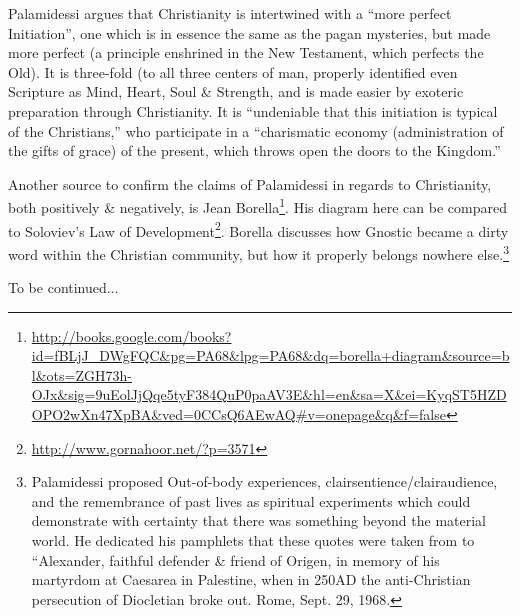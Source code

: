 Palamidessi argues that Christianity is intertwined with a ``more perfect Initiation'', one which is in essence the same as the pagan mysteries, but made more perfect (a principle enshrined in the New Testament, which perfects the Old). It is three-fold (to all three centers of man, properly identified even Scripture as Mind, Heart, Soul \& Strength, and is made easier by exoteric preparation through Christianity. It is ``undeniable that this initiation is typical of the Christians,'' who participate in a ``charismatic economy (administration of the gifts of grace) of the present, which throws open the doors to the Kingdom.''

Another source to confirm the claims of Palamidessi in regards to Christianity, both positively \& negatively, is Jean Borella\footnote{\url{http://books.google.com/books?id=fBLjJ_DWgFQC\&pg=PA68\&lpg=PA68\&dq=borella+diagram\&source=bl\&ots=ZGH73h-OJx\&sig=9uEolJjQqe5tyF384QuP0paAV3E\&hl=en\&sa=X\&ei=KyqST5HZDOPO2wXn47XpBA\&ved=0CCsQ6AEwAQ\#v=onepage\&q\&f=false}}. His diagram here can be compared to Soloviev's Law of Development\footnote{\url{http://www.gornahoor.net/?p=3571}}. Borella discusses how Gnostic became a dirty word within the Christian community, but how it properly belongs nowhere else.\footnote{Palamidessi proposed Out-of-body experiences, clairsentience/clairaudience, and the remembrance of past lives as spiritual experiments which could demonstrate with certainty that there was something beyond the material world. He dedicated his pamphlets that these quotes were taken from to ``Alexander, faithful defender \& friend of Origen, in memory of his martyrdom at Caesarea in Palestine, when in 250AD the anti-Christian persecution of Diocletian broke out. Rome, Sept. 29, 1968.}

To be continued...


